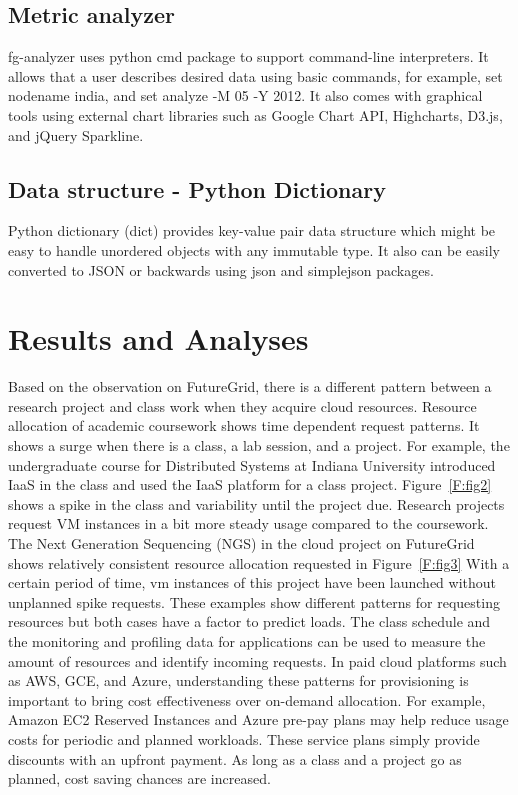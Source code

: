\documentclass{sig-alternate}
\begin{document}
\subsection{Metric analyzer}

fg-analyzer uses python cmd package to support command-line interpreters. It allows that a user describes desired data using basic commands, for example, set nodename india, and set analyze -M 05 -Y 2012. It also comes with graphical tools using external chart libraries such as Google Chart API, Highcharts, D3.js, and jQuery Sparkline.

\subsection{Data structure - Python Dictionary}

Python dictionary (dict) provides key-value pair data structure which might be easy to handle unordered objects with any immutable type. It also can be easily converted to JSON or backwards using json and simplejson packages.

\section{Results and Analyses} \label{S:result}

Based on the observation on FutureGrid, there is a different pattern between a research project and class work when they acquire cloud resources.  Resource allocation of academic coursework shows time dependent request patterns. It shows a surge when there is a class, a lab session, and a project. For example, the undergraduate course for Distributed Systems at Indiana University introduced IaaS in the class and used the IaaS platform for a class project. Figure~\ref{F:fig2} shows a spike in the class and variability until the project due. Research projects request VM instances in a bit more steady usage compared to the coursework. The Next Generation Sequencing (NGS) in the cloud project on FutureGrid shows relatively consistent resource allocation requested in Figure~\ref{F:fig3} With a certain period of time, vm instances of this project have been launched without unplanned spike requests. These examples show different patterns for requesting resources but both cases have a factor to predict loads. The class schedule and the monitoring and profiling data for applications can be used to measure the amount of resources and identify incoming requests. In paid cloud platforms such as AWS, GCE, and Azure, understanding these patterns for provisioning is important to bring cost effectiveness over on-demand allocation. For example, Amazon EC2 Reserved Instances and Azure pre-pay plans may help reduce usage costs for periodic and planned workloads. These service plans simply provide discounts with an upfront payment. As long as a class and a project go as planned, cost saving chances are increased. 
\end{document}

